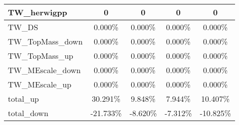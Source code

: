 \begin{table}[]
{\begin{tabular}{|l|c|c|c|c|}
TW\_herwigpp                & 0                       & 0                    & 0                      & 0                 \\ \hline
TW\_DS                      & 0.000\%                             & 0.000\%                          & 0.000\%                            & 0.000\%                       \\ \hline
TW\_TopMass\_down                & 0.000\%                       & 0.000\%                    & 0.000\%                      & 0.000\%                 \\ \hline
TW\_TopMass\_up                & 0.000\%                       & 0.000\%                    & 0.000\%                      & 0.000\%                 \\ \hline
TW\_MEscale\_down             & 0.000\%                    & 0.000\%                 & 0.000\%                   & 0.000\%              \\ \hline
TW\_MEscale\_up               & 0.000\%                      & 0.000\%                   & 0.000\%                     & 0.000\%                \\ \hline
total\_up                          & 30.291\%                           & 9.848\%                           & 7.944\%                          & 10.407\%                           \\ \hline 
total\_down                        & -21.733\%                         & -8.620\%                         & -7.312\%                        & -10.825\%                         \\ \hline \hline 
\end{tabular}}
\end{table}
